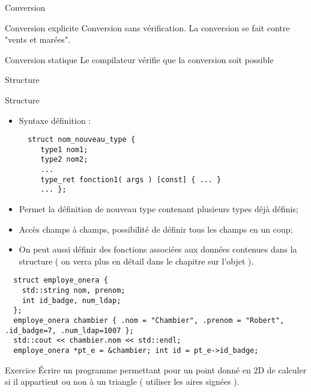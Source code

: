 \documentclass[handout,10pt]{beamer}
\newcommand{\includepartcode}[4][cpp]{

}
\begin{document}
\begin{frame}[fragile]{Conversion}
\tiny
\begin{block}{Conversion explicite}
Conversion sans vérification. La conversion se fait contre "vents et marées".
\includepartcode{conversion.cpp}{8}{16}
\end{block}

\begin{block}{Conversion statique}
Le compilateur vérifie que la conversion soit possible
\includepartcode{conversion.cpp}{20}{27}
\end{block}
\end{frame}

\begin{frame}[fragile]{Structure}
 \tiny
 \begin{block}{Structure}
  \begin{itemize}
  \item Syntaxe définition :
  \begin{lstlisting}
  struct nom_nouveau_type {
     type1 nom1;
     type2 nom2;
     ...
     type_ret fonction1( args ) [const] { ... }
     ... };
\end{lstlisting}

   \item Permet la définition de nouveau type contenant plusieurs types déjà définis;
   \item Accès champs à champs, possibilité de définir tous les champs en un coup;
   \item On peut aussi définir des fonctions associées aux données contenues dans la structure ( on verra plus en détail dans le chapitre sur l'objet ).
  \end{itemize}
  \begin{lstlisting}
  struct employe_onera {
    std::string nom, prenom;
    int id_badge, num_ldap;
  };
  employe_onera chambier { .nom = "Chambier", .prenom = "Robert", .id_badge=7, .num_ldap=1007 };
  std::cout << chambier.nom << std::endl;
  employe_onera *pt_e = &chambier; int id = pt_e->id_badge;
\end{lstlisting}
\end{block}
\begin{exampleblock}{Exercice}
\'Ecrire un programme permettant pour un point donné en 2D de calculer si il appartient ou non à un triangle ( utiliser les aires signées ).
\end{exampleblock}
\end{frame}
\end{document}
